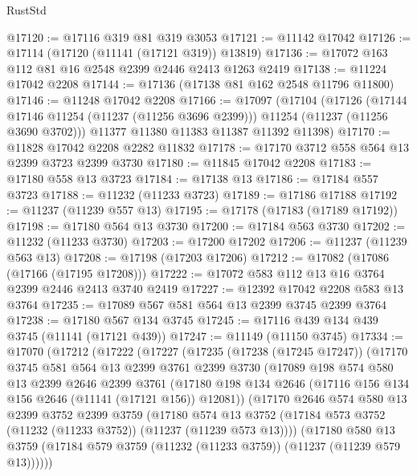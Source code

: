 \begin{lexlean}{RustStd}
\begin{coremodule}
@17120 := @17116 @319 @81 @319 @3053
@17121 := @11142 @17042
@17126 := @17114 (@17120 (@11141 (@17121 @319)) @13819)
@17136 := @17072 @163 @112 @81 @16 @2548 @2399 @2446 @2413 @1263 @2419
@17138 := @11224 @17042 @2208
@17144 := @17136 (@17138 @81 @162 @2548 @11796 @11800)
@17146 := @11248 @17042 @2208
@17166 := @17097
    (@17104
      (@17126
        (@17144 @17146 @11254 (@11237 (@11256 @3696 @2399)))
        @11254
        (@11237 (@11256 @3690 @3702)))
      @11377
      @11380
      @11383
      @11387
      @11392
      @11398)
@17170 := @11828 @17042 @2208 @2282 @11832
@17178 := @17170 @3712 @558 @564 @13 @2399 @3723 @2399 @3730
@17180 := @11845 @17042 @2208
@17183 := @17180 @558 @13 @3723
@17184 := @17138 @13
@17186 := @17184 @557 @3723
@17188 := @11232 (@11233 @3723)
@17189 := @17186 @17188
@17192 := @11237 (@11239 @557 @13)
@17195 := @17178 (@17183 (@17189 @17192))
@17198 := @17180 @564 @13 @3730
@17200 := @17184 @563 @3730
@17202 := @11232 (@11233 @3730)
@17203 := @17200 @17202
@17206 := @11237 (@11239 @563 @13)
@17208 := @17198 (@17203 @17206)
@17212 := @17082 (@17086 (@17166 (@17195 @17208)))
@17222 := @17072 @583 @112 @13 @16 @3764 @2399 @2446 @2413 @3740 @2419
@17227 := @12392 @17042 @2208 @583 @13 @3764
@17235 := @17089 @567 @581 @564 @13 @2399 @3745 @2399 @3764
@17238 := @17180 @567 @134 @3745
@17245 := @17116 @439 @134 @439 @3745 (@11141 (@17121 @439))
@17247 := @11149 (@11150 @3745)
@17334 := @17070
    (@17212
      (@17222
        (@17227
          (@17235
            (@17238 (@17245 @17247))
            (@17170
              @3745
              @581
              @564
              @13
              @2399
              @3761
              @2399
              @3730
              (@17089
                @198
                @574
                @580
                @13
                @2399
                @2646
                @2399
                @3761
                (@17180 @198 @134 @2646 (@17116 @156 @134 @156 @2646 (@11141 (@17121 @156)) @12081))
                (@17170
                  @2646
                  @574
                  @580
                  @13
                  @2399
                  @3752
                  @2399
                  @3759
                  (@17180
                    @574
                    @13
                    @3752
                    (@17184 @573 @3752 (@11232 (@11233 @3752)) (@11237 (@11239 @573 @13))))
                  (@17180
                    @580
                    @13
                    @3759
                    (@17184 @579 @3759 (@11232 (@11233 @3759)) (@11237 (@11239 @579 @13))))))

\end{coremodule}
\end{lexlean}
